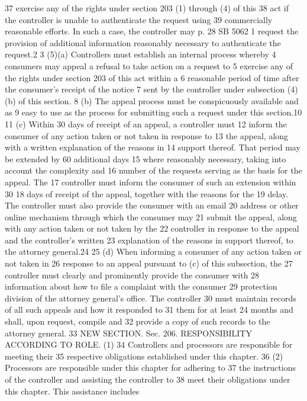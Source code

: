 37 exercise any of the rights under section 203 (1) through (4) of this
38 act if the controller is unable to authenticate the request using
39 commercially reasonable efforts. In such a case, the controller may
p. 28 SB 5062
1 request the provision of additional information reasonably necessary
to authenticate the request.2
3 (5)(a) Controllers must establish an internal process whereby
4 consumers may appeal a refusal to take action on a request to
5 exercise any of the rights under section 203 of this act within a
6 reasonable period of time after the consumer's receipt of the notice
7 sent by the controller under subsection (4)(b) of this section.
8 (b) The appeal process must be conspicuously available and as
9 easy to use as the process for submitting such a request under this
section.10
11 (c) Within 30 days of receipt of an appeal, a controller must
12 inform the consumer of any action taken or not taken in response to
13 the appeal, along with a written explanation of the reasons in
14 support thereof. That period may be extended by 60 additional days
15 where reasonably necessary, taking into account the complexity and
16 number of the requests serving as the basis for the appeal. The
17 controller must inform the consumer of such an extension within 30
18 days of receipt of the appeal, together with the reasons for the
19 delay. The controller must also provide the consumer with an email
20 address or other online mechanism through which the consumer may
21 submit the appeal, along with any action taken or not taken by the
22 controller in response to the appeal and the controller's written
23 explanation of the reasons in support thereof, to the attorney
general.24
25 (d) When informing a consumer of any action taken or not taken in
26 response to an appeal pursuant to (c) of this subsection, the
27 controller must clearly and prominently provide the consumer with
28 information about how to file a complaint with the consumer
29 protection division of the attorney general's office. The controller
30 must maintain records of all such appeals and how it responded to
31 them for at least 24 months and shall, upon request, compile and
32 provide a copy of such records to the attorney general.
33 NEW SECTION. Sec. 206. RESPONSIBILITY ACCORDING TO ROLE. (1)
34 Controllers and processors are responsible for meeting their
35 respective obligations established under this chapter.
36 (2) Processors are responsible under this chapter for adhering to
37 the instructions of the controller and assisting the controller to
38 meet their obligations under this chapter. This assistance includes
